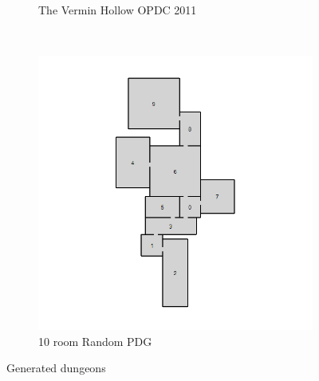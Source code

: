 \documentclass{UoYCSproject}
\begin{document}
\begin{figure}[htb]
\begin{subfigure}[b]{0.45\textwidth}
    \caption{The Vermin Hollow OPDC 2011}
  \end{subfigure}
  ~
  \begin{subfigure}[b]{0.45\textwidth}
    \centering
    \includegraphics[width=\textwidth]{figures/generated/RAND_10_6.jpg}
    \caption{10 room Random PDG}
  \end{subfigure}
  \caption{Generated dungeons}
  \label{fig:gen_dungeons}
\end{figure}

\printbibliography
\end{document}
